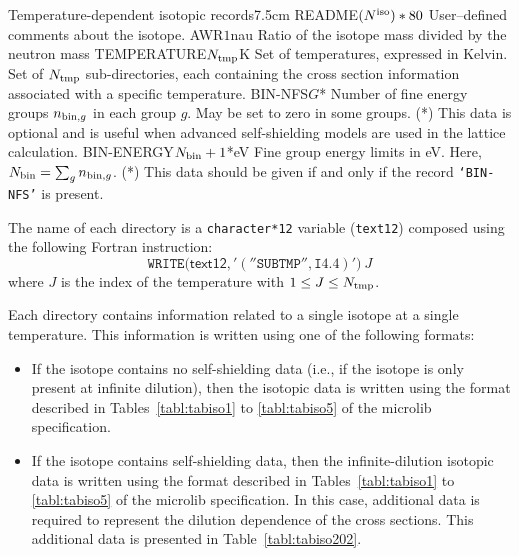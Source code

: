 \begin{DescriptionEnregistrement}{Temperature-dependent isotopic records}{7.5cm}
\label{tabl:tabiso201}
\CharEnr
  {README}{$(N^{\rm iso})*80$}
  {User--defined comments about the isotope.}
\RealEnr
  {AWR}{$1$}{nau}
  {Ratio of the isotope mass divided by the neutron mass}
\RealEnr
  {TEMPERATURE}{$N_{\rm tmp}$}{K}
  {Set of temperatures, expressed in Kelvin.}
\DirVar
  {}
  {Set of $N_{\rm tmp}$ sub-directories, each containing the cross section information
   associated with a specific temperature.}
\OptIntEnr
  {BIN-NFS}{$G$}{*}
  {Number of fine energy groups $n_{{\rm bin},g}$ in each group $g$. May be set to zero
  in some groups. (*) This data is optional and is useful when advanced self-shielding
  models are used in the lattice calculation.}
\OptRealEnr
  {BIN-ENERGY}{$N_{\rm bin}+1$}{*}{eV}
  {Fine group energy limits in eV. Here, $N_{\rm bin}=\sum_g n_{{\rm bin},g}$. (*) This data
  should be given if and only if the record {\tt `BIN-NFS'} is present.}
\end{DescriptionEnregistrement}

The name of each  directory is a {\tt character*12} variable ({\tt text12})
composed using the following Fortran instruction:
$$
\mathtt{WRITE(}\mathsf{text12}\mathtt{,'(''SUBTMP'',I4.4)')}\: J
$$
where $J$ is the index of the temperature with $1 \leq J \le N_{\rm tmp}$.

\vskip 0.2cm

Each  directory contains information related to a single isotope
at a single temperature. This information is written using one of the following formats:
\begin{itemize}
\item If the isotope contains no self-shielding data (i.e., if the isotope is
only present at infinite dilution), then the isotopic data is written using the format described
in Tables~\ref{tabl:tabiso1} to \ref{tabl:tabiso5} of the {\sc microlib}
specification.
\item If the isotope contains self-shielding data, then the infinite-dilution isotopic data is
written using the format described in Tables~\ref{tabl:tabiso1} to \ref{tabl:tabiso5} of the
{\sc microlib} specification. In this case, additional data is required to represent the
dilution dependence of the cross sections. This additional data is presented in Table~\ref{tabl:tabiso202}.
\end{itemize}

